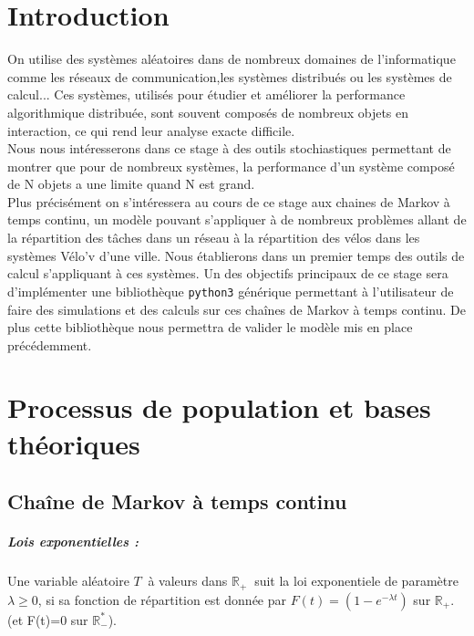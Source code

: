 \documentclass[a4paper,12pt]{report}
\def\D{\displaystyle}
\begin{document}
\chapter*{Introduction}

On utilise des systèmes aléatoires dans de nombreux domaines de
l'informatique comme les réseaux de communication,les systèmes
distribués ou les systèmes de calcul... Ces systèmes, utilisés pour étudier
et améliorer la performance algorithmique distribuée, sont souvent
composés de nombreux objets en interaction, ce qui rend leur analyse
exacte difficile. \\
\smallbreak
Nous nous intéresserons dans ce stage à des outils
stochiastiques permettant de montrer que pour de nombreux systèmes, la
performance d'un système composé de N objets a une limite quand N est grand. \\
Plus précisément on s'intéressera au cours de ce stage aux chaines de Markov à temps
continu, un modèle pouvant s'appliquer à de nombreux problèmes allant
de la répartition des tâches dans un réseau à la répartition des vélos
dans les systèmes Vélo'v d'une ville. Nous établierons dans un
premier temps des outils de calcul s'appliquant à ces systèmes. Un
des objectifs principaux de ce stage sera d'implémenter une
bibliothèque \texttt{python3} générique permettant à l'utilisateur de
faire des simulations et des calculs sur ces chaînes de Markov à temps
continu. De plus cette bibliothèque nous permettra de valider le modèle
mis en place précédemment.

\chapter{Processus de population et bases théoriques}

\section{Chaîne de Markov à temps continu}

\paragraph{Lois exponentielles :} 
Une variable aléatoire $\D T \ $ à valeurs dans $\D \mathbb{R}_+ \ $ suit la
loi exponentiele de paramètre $\D \lambda \geq 0$, si  sa fonction de
répartition est donnée par $\D F(t)=(1-e^{-\lambda t})$ sur
$\D \mathbb{R}_+$. (et F(t)=0 sur $\D \mathbb{R}_-^*$).
\end{document}
